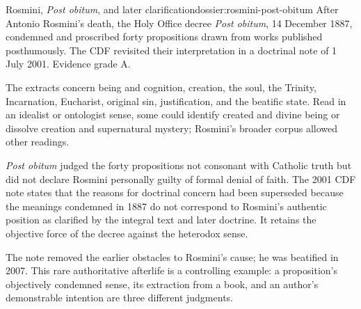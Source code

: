 \begin{heresydossier}{Rosmini, \emph{Post obitum}, and later clarification}{dossier:rosmini-post-obitum}
\objectfield After Antonio Rosmini's death, the Holy Office decree \emph{Post obitum}, 14 December 1887, condemned and proscribed forty propositions drawn from works published posthumously. The CDF revisited their interpretation in a doctrinal note of 1 July 2001. Evidence grade A.

\propositionfield The extracts concern being and cognition, creation, the soul, the Trinity, Incarnation, Eucharist, original sin, justification, and the beatific state. Read in an idealist or ontologist sense, some could identify created and divine being or dissolve creation and supernatural mystery; Rosmini's broader corpus allowed other readings.

\responsefield \emph{Post obitum} judged the forty propositions not consonant with Catholic truth but did not declare Rosmini personally guilty of formal denial of faith. The 2001 CDF note states that the reasons for doctrinal concern had been superseded because the meanings condemned in 1887 do not correspond to Rosmini's authentic position as clarified by the integral text and later doctrine. It retains the objective force of the decree against the heterodox sense.

\aftermathfield The note removed the earlier obstacles to Rosmini's cause; he was beatified in 2007. This rare authoritative afterlife is a controlling example: a proposition's objectively condemned sense, its extraction from a book, and an author's demonstrable intention are three different judgments.
\end{heresydossier}

